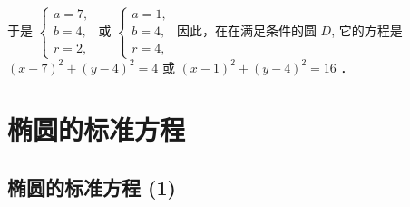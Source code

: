 \begin{enumerate}
\begin{jieda}
        于是 $\left\{\begin{array}{l}a=7, \\ b=4, \\ r=2,\end{array}\right.$ 或 $\left\{\begin{array}{l}a=1, \\ b=4, \\ r=4,\end{array}\right.$ 因此，在在满足条件的圆 $D$, 它的方程是 $(x-7)^2+(y-4)^2=4$ 或 $(x-1)^2+(y-4)^2=16$ ．
    \end{jieda}
    
\end{enumerate}

\section*{椭圆的标准方程 }
\subsection*{椭圆的标准方程 (1)}

